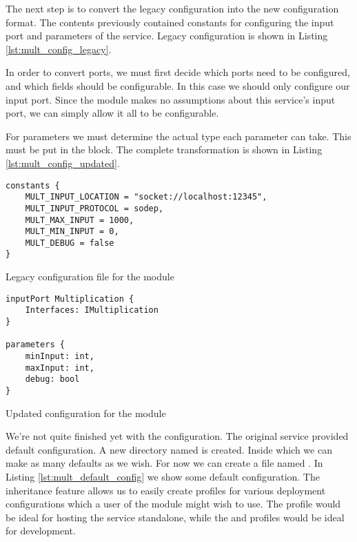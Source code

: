 The next step is to convert the legacy configuration into the new configuration
format. The contents  previously contained constants for
configuring the input port and parameters of the service. Legacy configuration
is shown in Listing \ref{lst:mult_config_legacy}.

In order to convert ports, we must first decide which ports need to be
configured, and which fields should be configurable. In this case we should
only configure our input port. Since the module makes no assumptions about this
service's input port, we can simply allow it all to be configurable.

For parameters we must determine the actual type each parameter can take. This
must be put in the  block. The complete transformation is
shown in Listing \ref{lst:mult_config_updated}.

\begin{listing}[H]

\begin{verbatim}
constants {
    MULT_INPUT_LOCATION = "socket://localhost:12345",
    MULT_INPUT_PROTOCOL = sodep,
    MULT_MAX_INPUT = 1000,
    MULT_MIN_INPUT = 0,
    MULT_DEBUG = false
}
\end{verbatim}

\caption{Legacy configuration file for the  module}

\label{lst:mult_config_legacy}

\end{listing}

\begin{listing}[H]
\begin{verbatim}
inputPort Multiplication {
    Interfaces: IMultiplication
}

parameters {
    minInput: int,
    maxInput: int,
    debug: bool
}
\end{verbatim}
\caption{Updated configuration for the  module}
\label{lst:mult_config_updated}
\end{listing}

We're not quite finished yet with the configuration. The original
service provided default configuration. A new directory named  is
created. Inside which we can make as many defaults as we wish. For now we can
create a file named . In Listing
\ref{lst:mult_default_config} we show some default configuration.  The
inheritance feature allows us to easily create profiles for various deployment
configurations which a user of the module might wish to use. The
 profile would be ideal for hosting the service
standalone, while the  and  profiles would
be ideal for development.

